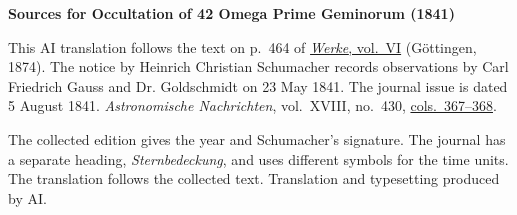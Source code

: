 \clearpage\thispagestyle{empty}
\begin{center}\textbf{Sources for Occultation of 42 Omega Prime Geminorum (1841)}\end{center}
\noindent This AI translation follows the text on p.~464 of \href{https://gdz.sub.uni-goettingen.de/id/PPN236007467}{\textit{Werke}, vol.~VI} (Göttingen, 1874). The notice by Heinrich Christian Schumacher records observations by Carl Friedrich Gauss and Dr. Goldschmidt on 23 May 1841. The journal issue is dated 5 August 1841. \textit{Astronomische Nachrichten}, vol.~XVIII, no.~430, \href{https://api.digitale-sammlungen.de/iiif/image/v2/bsb10049443_00194/full/1800,/0/default.jpg}{cols.~367--368}.
\par\smallskip\noindent The collected edition gives the year and Schumacher’s signature. The journal has a separate heading, \textit{Sternbedeckung}, and uses different symbols for the time units. The translation follows the collected text. Translation and typesetting produced by AI.
\clearpage
